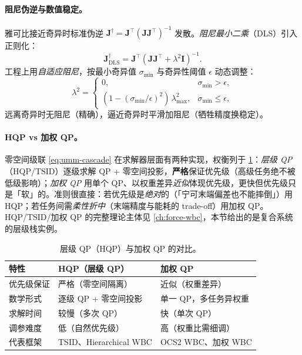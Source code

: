 \paragraph{阻尼伪逆与数值稳定。}
雅可比接近奇异时标准伪逆 $\mathbf J^{\dagger}=\mathbf J^\top(\mathbf J\mathbf J^\top)^{-1}$ 发散。\emph{阻尼最小二乘}（DLS）引入正则化：
\begin{equation}
  \mathbf J_{\text{DLS}}^{\dagger}=\mathbf J^\top(\mathbf J\mathbf J^\top+\lambda^2\mathbf I)^{-1}.
  \label{eq:umm-dls}
\end{equation}
工程上用\emph{自适应阻尼}，按最小奇异值 $\sigma_{\min}$ 与奇异性阈值 $\epsilon$ 动态调整：
\begin{equation}
  \lambda^2=\begin{cases}0, & \sigma_{\min}>\epsilon,\\[2pt](1-(\sigma_{\min}/\epsilon)^2)\,\lambda_{\max}^2, & \sigma_{\min}\le\epsilon,\end{cases}
  \label{eq:umm-adaptive-damp}
\end{equation}
远离奇异时无阻尼（精确），逼近奇异时平滑加阻尼（牺牲精度换稳定）。

\paragraph{HQP vs 加权 QP。}
零空间级联 \cref{eq:umm-cascade} 在求解器层面有两种实现，权衡列于 \cref{tab:umm-hqp}：\emph{层级 QP}（HQP/TSID）逐级求解 QP + 零空间投影，\textbf{严格}保证优先级（高级任务绝不被低级影响）；\emph{加权 QP} 用单个 QP、以权重差异\emph{近似}体现优先级，更快但优先级只是「软」的。准则很直接：若优先级是\emph{绝对}的（「宁可末端偏差也不能摔倒」）用 HQP；若任务间需\emph{柔性折中}（末端精度与能耗的 trade-off）用加权 QP。HQP/TSID/加权 QP 的完整理论主体见 \cref{ch:force-wbc}，本节给出的是复合系统的层级栈实例。

\begin{table}[H]\centering\small
\caption{层级 QP（HQP）与加权 QP 的对比。}
\label{tab:umm-hqp}
\begin{tabular}{lll}
\toprule
特性 & HQP（层级 QP） & 加权 QP \\
\midrule
优先级保证 & 严格（零空间隔离） & 近似（权重差异） \\
数学形式 & 逐级 QP + 零空间投影 & 单一 QP，多任务异权重 \\
求解时间 & 较慢（多次 QP） & 快（单次 QP） \\
调参难度 & 低（自然优先级） & 高（权重比需细调） \\
代表框架 & TSID、Hierarchical WBC & OCS2 WBC、加权 WBC \\
\bottomrule
\end{tabular}
\end{table}

